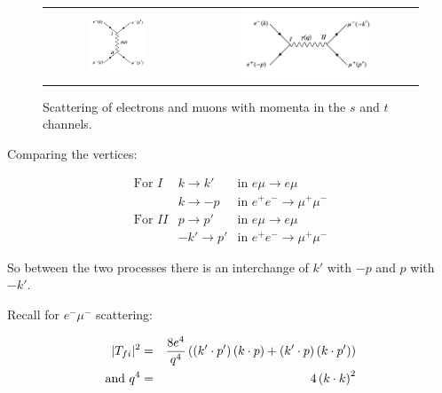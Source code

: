 \begin{figure}[!htb]
  \begin{center}
    \begin{tabular}{cc}
      \includegraphics[width=0.4\textwidth]{images/web_feynman/image_25.png} &
      \includegraphics[width=0.6\textwidth]{images/web_feynman/image_26.png}
    \end{tabular}
    \caption[Scattering of electrons and muons with momenta in the $s$ and $t$ channels]{Scattering of electrons and muons with momenta in the $s$ and $t$ channels.}
    \label{fig:ch8_EMuToEMuMomentaSTChannels}
  \end{center}
\end{figure}

Comparing the vertices:

\[
\begin{array}{ccc}
  \textrm{For }I  & k \to k'  & \textrm{in } e\mu \to e\mu         \\
                  & k \to -p  & \textrm{in } e^+e^- \to \mu^+\mu^- \\
  \textrm{For }II & p \to p'  & \textrm{in } e\mu \to e\mu         \\
                  & -k'\to p' & \textrm{in } e^+e^- \to \mu^+\mu^-
\end{array}
\]

So between the two processes there is an interchange of $k'$ with $-p$ and $p$ with $-k'$.

Recall for $e^-\mu^-$ scattering:

\begin{eqnarray*}
  |T_{fi}|^2 & = & \frac{8e^4}{q^4}\left(\left(k'\cdot p'\right)\left(k\cdot p\right) + \left(k'\cdot p\right)\left(k\cdot p'\right)\right) \\
  \textrm{and } q^4 & = & 4\left(k\cdot k\right)^2 \\
\end{eqnarray*}

